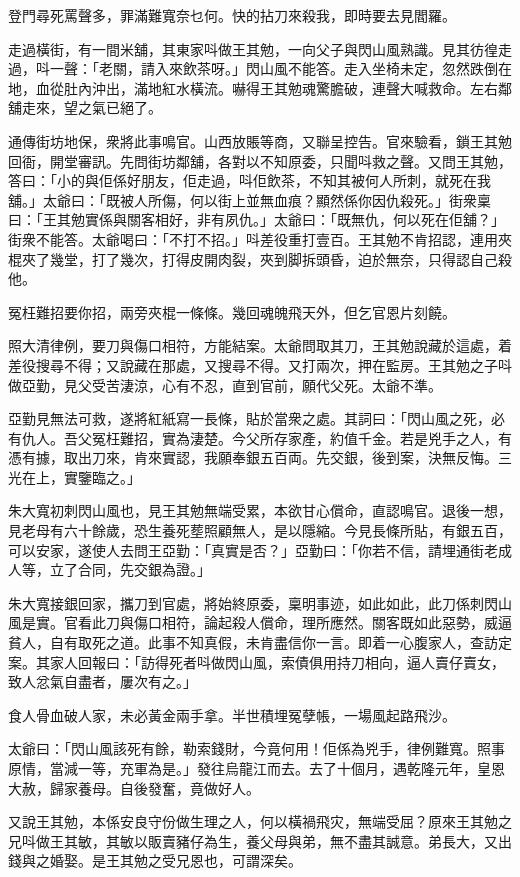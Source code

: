 \documentclass[a5paper, 12pt, openany]{book} %
\begin{document}
	登門尋死罵聲多，罪滿難寬奈乜何。快的拈刀來殺我，即時要去見閻羅。

	走過橫街，有一間米舖，其東家呌做王其勉，一向父子與閃山風熟識。見其彷徨走過，呌一聲：「老關，請入來飲茶呀。」閃山風不能答。走入坐椅未定，忽然跌倒在地，血從肚內沖出，滿地紅水橫流。嚇得王其勉魂驚膽破，連聲大喊救命。左右鄰舖走來，望之氣已絕了。

	通傳街坊地保，衆將此事鳴官。山西放賬等商，又聯呈控告。官來驗看，鎖王其勉回衙，開堂審訊。先問街坊鄰舖，各對以不知原委，只聞呌救之聲。又問王其勉，答曰：「小的與佢係好朋友，佢走過，呌佢飲茶，不知其被何人所刺，就死在我舖。」太爺曰：「既被人所傷，何以街上並無血痕？顯然係你因仇殺死。」街衆稟曰：「王其勉實係與關客相好，非有夙仇。」太爺曰：「既無仇，何以死在佢舖？」街衆不能答。太爺喝曰：「不打不招。」呌差役重打壹百。王其勉不肯招認，連用夾棍夾了幾堂，打了幾次，打得皮開肉裂，夾到脚拆頭昏，迫於無奈，只得認自己殺他。

	冤枉難招要你招，兩旁夾棍一條條。幾回魂魄飛天外，但乞官恩片刻饒。

	照大清律例，要刀與傷口相符，方能結案。太爺問取其刀，王其勉說藏於這處，着差役搜尋不得；又說藏在那處，又搜尋不得。又打兩次，押在監房。王其勉之子呌做亞勤，見父受苦淒涼，心有不忍，直到官前，願代父死。太爺不準。

	亞勤見無法可救，遂將紅紙寫一長條，貼於當衆之處。其詞曰：「閃山風之死，必有仇人。吾父冤枉難招，實為淒楚。今父所存家產，約值千金。若是兇手之人，有憑有據，取出刀來，肯來實認，我願奉銀五百両。先交銀，後到案，決無反悔。三光在上，實鑒臨之。」

	朱大寬初刺閃山風也，見王其勉無端受累，本欲甘心償命，直認鳴官。退後一想，見老母有六十餘歲，恐生養死塟照顧無人，是以隱縮。今見長條所貼，有銀五百，可以安家，遂使人去問王亞勤：「真實是否？」亞勤曰：「你若不信，請埋通街老成人等，立了合同，先交銀為證。」

	朱大寬接銀回家，攜刀到官處，將始終原委，稟明事迹，如此如此，此刀係刺閃山風是實。官看此刀與傷口相符，論起殺人償命，理所應然。關客既如此惡勢，威逼貧人，自有取死之道。此事不知真假，未肯盡信你一言。即着一心腹家人，查訪定案。其家人回報曰：「訪得死者呌做閃山風，索債俱用持刀相向，逼人賣仔賣女，致人忿氣自盡者，屢次有之。」

	食人骨血破人家，未必黃金兩手拿。半世積埋冤孽帳，一場風起路飛沙。

	太爺曰：「閃山風該死有餘，勒索錢財，今竟何用！佢係為兇手，律例難寬。照事原情，當減一等，充軍為是。」發往烏龍江而去。去了十個月，遇乾隆元年，皇恩大赦，歸家養母。自後發奮，竟做好人。

	又說王其勉，本係安良守份做生理之人，何以橫禍飛灾，無端受屈？原來王其勉之兄呌做王其敏，其敏以販賣豬仔為生，養父母與弟，無不盡其誠意。弟長大，又出錢與之婚娶。是王其勉之受兄恩也，可謂深矣。
\end{document}
